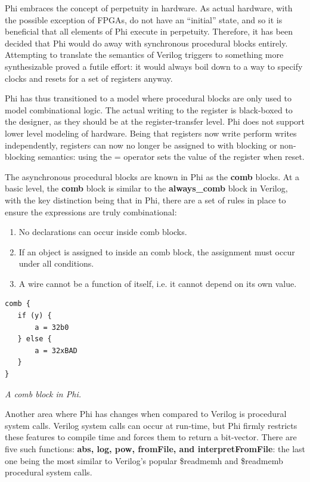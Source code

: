 \documentclass[10pt, two column]{article}
\theoremstyle{definition}
\begin{document}
Phi embraces the concept of perpetuity in hardware. As actual hardware, with the possible exception of FPGAs, do not have an “initial” state, and so it is beneficial that all elements of Phi execute in perpetuity. Therefore, it has been decided that Phi would do away with synchronous procedural blocks entirely. Attempting to translate the semantics of Verilog triggers to something more synthesizable proved a futile effort: it would always boil down to a way to specify clocks and resets for a set of registers anyway.

Phi has thus transitioned to a model where procedural blocks are only used to model combinational logic. The actual writing to the register is black-boxed to the designer, as they should be at the register-transfer level. Phi does not support lower level modeling of hardware. Being that registers now write perform writes independently, registers can now no longer be assigned to with blocking or non-blocking semantics: using the = operator sets the value of the register when reset.\par

The asynchronous procedural blocks are known in Phi as the \textbf{comb} blocks. At a basic level, the \textbf{comb} block is similar to the \textbf{always\_comb} block in Verilog, with the key distinction being that in Phi, there are a set of rules in place to ensure the expressions are truly combinational:

\begin{enumerate}[label=\alph*)]
\item No declarations can occur inside comb blocks.
\item If an object is assigned to inside an comb block, the assignment must occur under all conditions.
\item A wire cannot be a function of itself, i.e. it cannot depend on its own value.
\end{enumerate}

\begin{lstlisting}
comb {
   if (y) {
       a = 32b0
   } else {
       a = 32xBAD
   }
}
\end{lstlisting}
\begin{center}
\textit {A comb block in Phi.}
\end{center}

Another area where Phi has changes when compared to Verilog is procedural system calls. Verilog system calls can occur at run-time, but Phi firmly restricts these features to compile time and forces them to return a bit-vector. There are five such functions: \textbf{abs, log, pow, fromFile, and interpretFromFile}: the last one being the most similar to Verilog's popular \$readmemh and \$readmemb procedural system calls.
\end{document}
